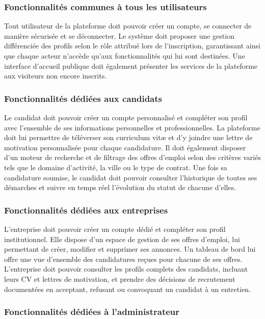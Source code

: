 \documentclass[12pt,a4paper]{report}
\begin{document}
\subsubsection{Fonctionnalités communes à tous les utilisateurs}

Tout utilisateur de la plateforme doit pouvoir créer un compte, se connecter de manière sécurisée et se déconnecter. Le système doit proposer une gestion différenciée des profils selon le rôle attribué lors de l'inscription, garantissant ainsi que chaque acteur n'accède qu'aux fonctionnalités qui lui sont destinées. Une interface d'accueil publique doit également présenter les services de la plateforme aux visiteurs non encore inscrits.

\subsubsection{Fonctionnalités dédiées aux candidats}

Le candidat doit pouvoir créer un compte personnalisé et compléter son profil avec l'ensemble de ses informations personnelles et professionnelles. La plateforme doit lui permettre de téléverser son curriculum vitæ et d'y joindre une lettre de motivation personnalisée pour chaque candidature. Il doit également disposer d'un moteur de recherche et de filtrage des offres d'emploi selon des critères variés tels que le domaine d'activité, la ville ou le type de contrat. Une fois sa candidature soumise, le candidat doit pouvoir consulter l'historique de toutes ses démarches et suivre en temps réel l'évolution du statut de chacune d'elles.

\subsubsection{Fonctionnalités dédiées aux entreprises}

L'entreprise doit pouvoir créer un compte dédié et compléter son profil institutionnel. Elle dispose d'un espace de gestion de ses offres d'emploi, lui permettant de créer, modifier et supprimer ses annonces. Un tableau de bord lui offre une vue d'ensemble des candidatures reçues pour chacune de ses offres. L'entreprise doit pouvoir consulter les profils complets des candidats, incluant leurs CV et lettres de motivation, et prendre des décisions de recrutement documentées en acceptant, refusant ou convoquant un candidat à un entretien.

\subsubsection{Fonctionnalités dédiées à l'administrateur}
\end{document}
